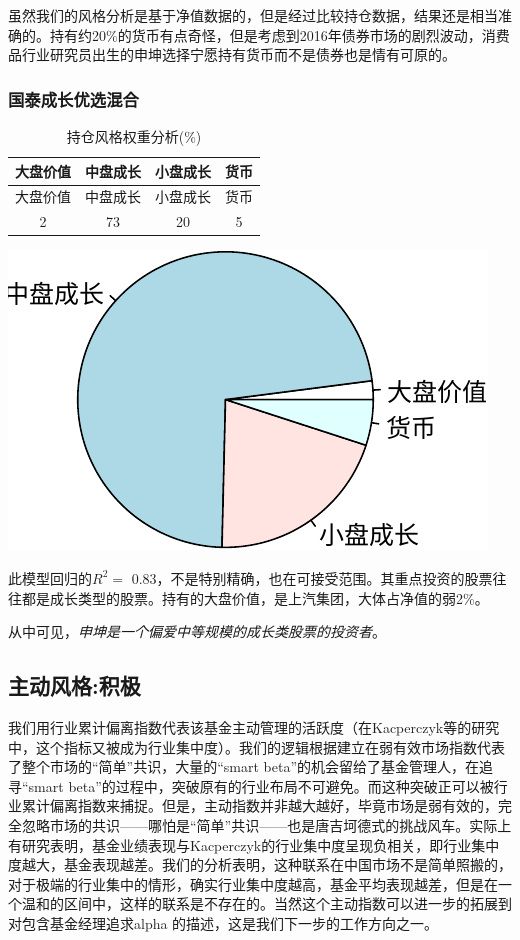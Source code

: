 \documentclass[hyperref,]{ctexart}
\begin{document}
虽然我们的风格分析是基于净值数据的，但是经过比较持仓数据，结果还是相当准确的。持有约20\%的货币有点奇怪，但是考虑到2016年债券市场的剧烈波动，消费品行业研究员出生的申坤选择宁愿持有货币而不是债券也是情有可原的。

\subsubsection{国泰成长优选混合}\label{-1}

\begin{longtable}[]{@{}cccc@{}}
\caption{持仓风格权重分析(\%)}\tabularnewline
\toprule
大盘价值 & 中盘成长 & 小盘成长 & 货币\tabularnewline
\midrule
\endfirsthead
\toprule
大盘价值 & 中盘成长 & 小盘成长 & 货币\tabularnewline
\midrule
\endhead
2 & 73 & 20 & 5\tabularnewline
\bottomrule
\end{longtable}

\includegraphics{shenkun-details_files/figure-latex/unnamed-chunk-9-1.pdf}

此模型回归的\(R^2=\)
0.83，不是特别精确，也在可接受范围。其重点投资的股票往往都是成长类型的股票。持有的大盘价值，是上汽集团，大体占净值的弱2\%。

从中可见，\emph{申坤是一个偏爱中等规模的成长类股票的投资者}。

\subsection{主动风格:积极}

我们用行业累计偏离指数代表该基金主动管理的活跃度（在Kacperczyk等的研究中，这个指标又被成为行业集中度）。我们的逻辑根据建立在弱有效市场指数代表了整个市场的``简单''共识，大量的``smart
beta''的机会留给了基金管理人，在追寻``smart
beta''的过程中，突破原有的行业布局不可避免。而这种突破正可以被行业累计偏离指数来捕捉。但是，主动指数并非越大越好，毕竟市场是弱有效的，完全忽略市场的共识------哪怕是``简单''共识------也是唐吉坷德式的挑战风车。实际上有研究表明，基金业绩表现与Kacperczyk的行业集中度呈现负相关，即行业集中度越大，基金表现越差。我们的分析表明，这种联系在中国市场不是简单照搬的，对于极端的行业集中的情形，确实行业集中度越高，基金平均表现越差，但是在一个温和的区间中，这样的联系是不存在的。当然这个主动指数可以进一步的拓展到对包含基金经理追求alpha
的描述，这是我们下一步的工作方向之一。
\end{document}
